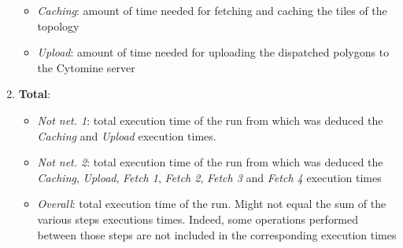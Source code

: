 \begin{enumerate}
	\begin{itemize}
		\item \textit{Caching}: amount of time needed for fetching and caching the tiles of the topology
		\item \textit{Upload}: amount of time needed for uploading the dispatched polygons to the Cytomine server
	\end{itemize}
	\item \textbf{Total}: 
	\begin{itemize}
		\item \textit{Not net. 1}: total execution time of the run from which was deduced the \textit{Caching} and \textit{Upload} execution times. 
		\item \textit{Not net. 2}: total execution time of the run from which was deduced the \textit{Caching}, \textit{Upload}, \textit{Fetch 1}, \textit{Fetch 2}, \textit{Fetch 3} and \textit{Fetch 4} execution times
		\item \textit{Overall}: total execution time of the run. Might not equal the sum of the various steps executions times. Indeed, some operations performed between those steps are not included in the corresponding execution times
	\end{itemize}		
	
\end{enumerate}

